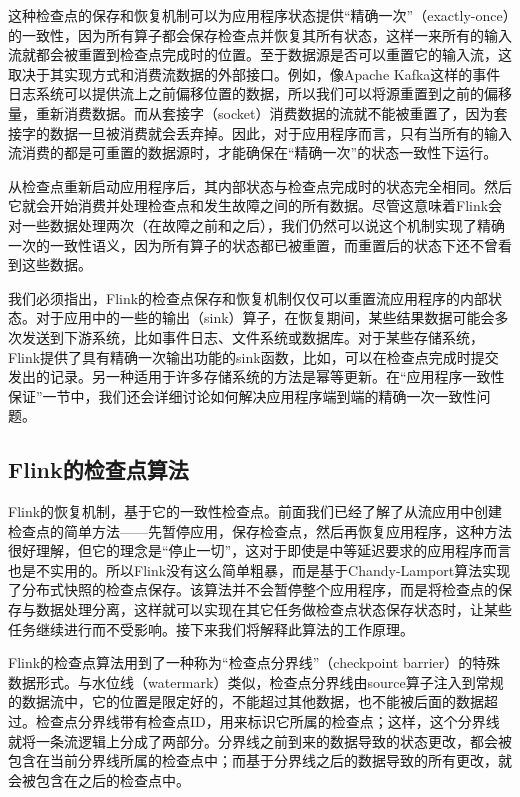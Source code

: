 \documentclass[oneside]{ctexbook}
\begin{document}
这种检查点的保存和恢复机制可以为应用程序状态提供“精确一次”（exactly-once）的一致性，因为所有算子都会保存检查点并恢复其所有状态，这样一来所有的输入流就都会被重置到检查点完成时的位置。至于数据源是否可以重置它的输入流，这取决于其实现方式和消费流数据的外部接口。例如，像Apache Kafka这样的事件日志系统可以提供流上之前偏移位置的数据，所以我们可以将源重置到之前的偏移量，重新消费数据。而从套接字（socket）消费数据的流就不能被重置了，因为套接字的数据一旦被消费就会丢弃掉。因此，对于应用程序而言，只有当所有的输入流消费的都是可重置的数据源时，才能确保在“精确一次”的状态一致性下运行。

从检查点重新启动应用程序后，其内部状态与检查点完成时的状态完全相同。然后它就会开始消费并处理检查点和发生故障之间的所有数据。尽管这意味着Flink会对一些数据处理两次（在故障之前和之后），我们仍然可以说这个机制实现了精确一次的一致性语义，因为所有算子的状态都已被重置，而重置后的状态下还不曾看到这些数据。

我们必须指出，Flink的检查点保存和恢复机制仅仅可以重置流应用程序的内部状态。对于应用中的一些的输出（sink）算子，在恢复期间，某些结果数据可能会多次发送到下游系统，比如事件日志、文件系统或数据库。对于某些存储系统，Flink提供了具有精确一次输出功​​能的sink函数，比如，可以在检查点完成时提交发出的记录。另一种适用于许多存储系统的方法是幂等更新。在“应用程序一致性保证”一节中，我们还会详细讨论如何解决应用程序端到端的精确一次一致性问题。

\subsection{Flink的检查点算法}

Flink的恢复机制，基于它的一致性检查点。前面我们已经了解了从流应用中创建检查点的简单方法——先暂停应用，保存检查点，然后再恢复应用程序，这种方法很好理解，但它的理念是“停止一切”，这对于即使是中等延迟要求的应用程序而言也是不实用的。所以Flink没有这么简单粗暴，而是基于Chandy-Lamport算法实现了分布式快照的检查点保存。该算法并不会暂停整个应用程序，而是将检查点的保存与数据处理分离，这样就可以实现在其它任务做检查点状态保存状态时，让某些任务继续进行而不受影响。接下来我们将解释此算法的工作原理。

Flink的检查点算法用到了一种称为“检查点分界线”（checkpoint barrier）的特殊数据形式。与水位线（watermark）类似，检查点分界线由source算子注入到常规的数据流中，它的位置是限定好的，不能超过其他数据，也不能被后面的数据超过。检查点分界线带有检查点ID，用来标识它所属的检查点；这样，这个分界线就将一条流逻辑上分成了两部分。分界线之前到来的数据导致的状态更改，都会被包含在当前分界线所属的检查点中；而基于分界线之后的数据导致的所有更改，就会被包含在之后的检查点中。
\end{document}
